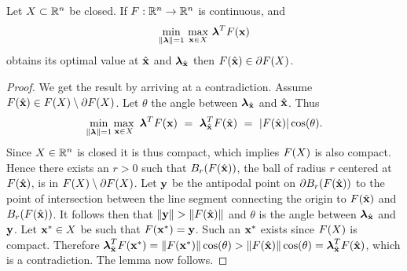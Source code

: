 \begin{lem} 
\label{lem:BdOpt}
Let $X\subset\mathbb{R}^n$ be closed. If $F:\mathbb{R}^n\rightarrow\mathbb{R}^n$ is continuous, and 
\[
\min\limits_{\lVert\boldsymbol{\lambda}\rVert=1} \, \max\limits_{\mathbf{x}\in X} \, \boldsymbol{\lambda}^TF(\mathbf{x})
\]
obtains its optimal value at $\hat{\mathbf{x}}$ and $\boldsymbol{\lambda}_{\hat{\mathbf{x}}}$ then $F(\hat{\mathbf{x}})\in \partial F(X)$. 


\begin{proof} 
  We get the result by arriving at a contradiction.
  Assume $F(\hat{\mathbf{x}})\in F(X)\setminus\partial F(X)$. 
  Let $\theta$ the angle between $\boldsymbol{\lambda}_{\hat{\mathbf{x}}}$ and $\hat{\mathbf{x}}$. 
  Thus
  \[
  \min\limits_{\lVert\boldsymbol{\lambda}\rVert=1}\max\limits_{\mathbf{x}\in X}\ \boldsymbol{\lambda}^TF(\mathbf{x}) ~=~ \boldsymbol{\lambda}_{\hat{\mathbf{x}}}^TF(\hat{\mathbf{x}}) ~=~ |F(\hat{\mathbf{x}})|\cos(\theta).
  \]
  Since $X\in\mathbb{R}^n$ is closed it is thus compact, which implies $F(X)$ is also compact. 
  Hence there exists an $r>0$ such that  $B_r(F(\hat{\mathbf{x}}))$, the ball of radius $r$ centered at $F(\hat{\mathbf{x}})$, is in $F(X)\setminus\partial F(X)$. 
  Let $\mathbf{y}$ be the antipodal point on $\partial B_r(F(\hat{\mathbf{x}}))$ to the point of intersection between the line segment connecting the origin to $F(\hat{\mathbf{x}})$ and $B_r(F(\hat{\mathbf{x}}))$. 
  It follows then that $\lVert\mathbf{y}\rVert>\lVert F(\hat{\mathbf{x}})\rVert$ and $\theta$ is the angle between $\boldsymbol{\lambda}_{\hat{\mathbf{x}}}$ and $\mathbf{y}$.   
  Let $\mathbf{x}^*\in X$ be such that $F(\mathbf{x}^*)=\mathbf{y}$.
  Such an $\mathbf{x}^*$ exists since $F(X)$ is compact. 
  Therefore $\boldsymbol{\lambda}_{\hat{\mathbf{x}}}^TF(\mathbf{x}^*)=\lVert F(\mathbf{x}^*)\rVert \cos(\theta) > \lVert F(\hat{\mathbf{x}})\rVert \cos(\theta) = \boldsymbol{\lambda}_{\hat{\mathbf{x}}}^TF(\hat{\mathbf{x}})$, which is a contradiction. 
  The lemma now follows.
\end{proof}
\end{lem}


